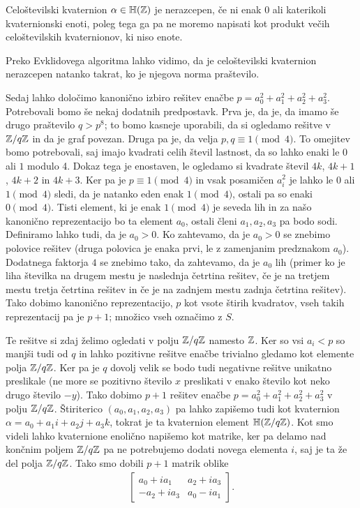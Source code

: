 \begin{definicija}
    Celoštevilski kvaternion \(\alpha\in \mathbb H(\mathbb Z)\) je nerazcepen, če ni enak \(0\) ali katerikoli kvaternionski enoti, poleg tega ga pa ne moremo napisati kot produkt večih celoštevilskih kvaternionov, ki niso enote.
\end{definicija}
Preko Evklidovega algoritma lahko vidimo, da je celoštevilski kvaternion nerazcepen natanko takrat, ko je njegova norma praštevilo. 

Sedaj lahko določimo kanonično izbiro rešitev enačbe \(p=a_0^2 + a_1^2 + a_2^2 + a_3^2\). Potrebovali bomo še nekaj dodatnih predpostavk. Prva je, da je, da imamo še drugo praštevilo \(q>p^8\); to bomo kasneje uporabili, da si ogledamo rešitve v \(\mathbb Z/q\mathbb Z\) in da je graf povezan. Druga pa je, da velja \(p,q \equiv 1 \pmod 4\). To omejitev bomo potrebovali, saj imajo kvadrati celih števil lastnost, da so lahko enaki le \(0\) ali \(1\) modulo 4. Dokaz tega je enostaven, le ogledamo si kvadrate števil \(4k\), \(4k+1\), \(4k+2\) in \(4k+3\). Ker pa je \(p\equiv 1 \pmod 4\) in vsak posamičen \(a_i^2\) je lahko le \(0\) ali \(1\pmod 4\) sledi, da je natanko eden enak \(1\pmod4\), ostali pa so enaki \(0\pmod 4\). Tisti element, ki je enak \(1\pmod4\) je seveda lih in za našo kanonično reprezentacijo bo ta element \(a_0\), ostali členi \(a_1, a_2, a_3\) pa bodo sodi. Definiramo lahko tudi, da je \(a_0>0\). Ko zahtevamo, da je \(a_0>0\) se znebimo polovice rešitev (druga polovica je enaka prvi, le z zamenjanim predznakom \(a_0\)). Dodatnega faktorja \(4\) se znebimo tako, da zahtevamo, da je \(a_0\) lih (primer ko je liha številka na drugem mestu je naslednja četrtina rešitev, če je na tretjem mestu tretja četrtina rešitev in če je na zadnjem mestu zadnja četrtina rešitev). Tako dobimo kanonično reprezentacijo, \(p\) kot vsote štirih kvadratov, vseh takih reprezentacij pa je \(p+1\); množico vseh označimo z \(S\).

Te rešitve si zdaj želimo ogledati v polju \(\mathbb Z/q\mathbb Z\) namesto \(\mathbb Z\). Ker so vsi \(a_i<p\) so manjši tudi od \(q\) in lahko pozitivne rešitve enačbe trivialno gledamo kot elemente polja \(\mathbb Z/q\mathbb Z\). Ker pa je \(q\) dovolj velik se bodo tudi negativne rešitve unikatno preslikale (ne more se pozitivno število \(x\) preslikati v enako število kot neko drugo število \(-y\)). Tako dobimo \(p+1\) rešitev enačbe \(p=a_0^2 + a_1^2 + a_2^2 + a_3^2\) v polju \(\mathbb Z/q\mathbb Z\). Štiriterico \((a_0, a_1, a_2, a_3)\) pa lahko zapišemo tudi kot kvaternion \(\alpha = a_0 + a_1i + a_2j + a_3k\), tokrat je ta kvaternion element \(\mathbb H(\mathbb Z/q\mathbb Z)\). Kot smo videli lahko kvaternione enolično napišemo kot matrike, ker pa delamo nad končnim poljem \(\mathbb Z/q\mathbb Z\) pa ne potrebujemo dodati novega elementa \(i\), saj je ta že del polja \(\mathbb Z/q\mathbb Z\). Tako smo dobili \(p+1\) matrik oblike
\begin{align*}
    \begin{bmatrix}
        a_0 +ia_1 & a_2+ia_3 \\
        -a_2+ia_3 & a_0-ia_1
    \end{bmatrix}.
\end{align*}

